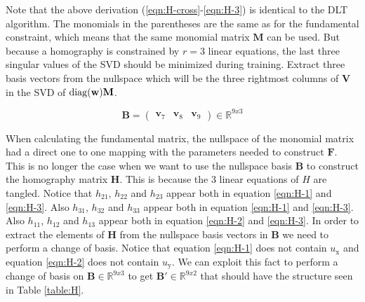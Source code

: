 Note that the above derivation (\ref{eqn:H-cross}-\ref{eqn:H-3}) is identical to the DLT algorithm\cite{Hartley2004}. The monomials in the parentheses are the same as for the fundamental constraint, which means that the same monomial matrix $\textbf{M}$ can be used. But because a homography is constrained by $r=3$ linear equations, the last three singular values of the SVD should be minimized during training. Extract three basis vectors from the nullspace which will be the three rightmost columns of $\textbf{V}$ in the SVD of $\operatorname{diag}(\textbf{w})\textbf{M}$.

\begin{equation}
\mathbf{B} = 
\begin{pmatrix}
\textbf{v}_7 & \textbf{v}_8 & \textbf{v}_9
\end{pmatrix}
\in \mathbb{R}^{9x3}
\end{equation}

When calculating the fundamental matrix, the nullspace of the monomial matrix had a direct one to one mapping with the parameters needed to construct $\textbf{F}$. This is no longer the case when we want to use the nullspace basis $\textbf{B}$ to construct the homography matrix $\textbf{H}$. This is because the 3 linear equations of $H$ are tangled. Notice that $h_{21}$, $h_{22}$ and $h_{23}$ appear both in equation \ref{eqn:H-1} and \ref{eqn:H-3}. Also $h_{31}$, $h_{32}$ and $h_{33}$ appear both in equation \ref{eqn:H-1} and \ref{eqn:H-3}. Also $h_{11}$, $h_{12}$ and $h_{13}$ appear both in equation \ref{eqn:H-2} and \ref{eqn:H-3}. In order to extract the elements of $\textbf{H}$ from the nullspace basis vectors in $\textbf{B}$ we need to perform a change of basis.
Notice that equation \ref{eqn:H-1} does not contain $u_\mathrm{x}$ and equation \ref{eqn:H-2} does not contain $u_\mathrm{y}$. We can exploit this fact to perform a change of basis on $\textbf{B} \in \mathbb{R}^{9x3}$ to get $\textbf{B}' \in \mathbb{R}^{9x2}$ that should have the structure seen in Table \ref{table:H}.

